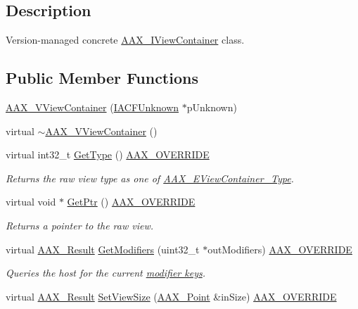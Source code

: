 \subsection{Description}
Version-\/managed concrete \hyperlink{a00117}{A\+A\+X\+\_\+\+I\+View\+Container} class. \subsection*{Public Member Functions}
\begin{DoxyCompactItemize}
\item 
\hyperlink{a00142_aac7bd02ee005502da1d1b81667ced4a3}{A\+A\+X\+\_\+\+V\+View\+Container} (\hyperlink{a00146}{I\+A\+C\+F\+Unknown} $\ast$p\+Unknown)
\item 
virtual \hyperlink{a00142_adbfffee1cc018285c910b1bcd19b2095}{$\sim$\+A\+A\+X\+\_\+\+V\+View\+Container} ()
\item 
virtual int32\+\_\+t \hyperlink{a00142_a8616b9553dbe565bdde053ac8306f88b}{Get\+Type} () \hyperlink{a00149_ac2f24a5172689ae684344abdcce55463}{A\+A\+X\+\_\+\+O\+V\+E\+R\+R\+I\+D\+E}
\begin{DoxyCompactList}\small\item\em Returns the raw view type as one of \hyperlink{a00214_ab4c36de253fc80b541eb51074c64caef}{A\+A\+X\+\_\+\+E\+View\+Container\+\_\+\+Type}. \end{DoxyCompactList}\item 
virtual void $\ast$ \hyperlink{a00142_a0f67da1cab8283875f4cffd61db3c2c3}{Get\+Ptr} () \hyperlink{a00149_ac2f24a5172689ae684344abdcce55463}{A\+A\+X\+\_\+\+O\+V\+E\+R\+R\+I\+D\+E}
\begin{DoxyCompactList}\small\item\em Returns a pointer to the raw view. \end{DoxyCompactList}\item 
virtual \hyperlink{a00149_a4d8f69a697df7f70c3a8e9b8ee130d2f}{A\+A\+X\+\_\+\+Result} \hyperlink{a00142_a076035df9053b642e1e838c841941525}{Get\+Modifiers} (uint32\+\_\+t $\ast$out\+Modifiers) \hyperlink{a00149_ac2f24a5172689ae684344abdcce55463}{A\+A\+X\+\_\+\+O\+V\+E\+R\+R\+I\+D\+E}
\begin{DoxyCompactList}\small\item\em Queries the host for the current \hyperlink{a00206_a47756e0a56d00468b7045eb26500cb78}{modifier keys}. \end{DoxyCompactList}\item 
virtual \hyperlink{a00149_a4d8f69a697df7f70c3a8e9b8ee130d2f}{A\+A\+X\+\_\+\+Result} \hyperlink{a00142_abbde6c9b0a40fd377ac2f87efed9dd28}{Set\+View\+Size} (\hyperlink{a00119}{A\+A\+X\+\_\+\+Point} \&in\+Size) \hyperlink{a00149_ac2f24a5172689ae684344abdcce55463}{A\+A\+X\+\_\+\+O\+V\+E\+R\+R\+I\+D\+E}

\end{DoxyCompactItemize}
